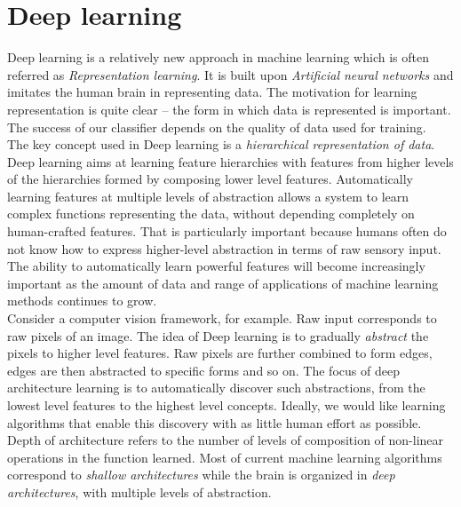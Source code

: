 
\section{Deep learning}

Deep learning is a relatively new approach in machine learning which is often referred  as \textit{Representation learning}. It is built upon \textit{Artificial neural networks} and imitates the human brain in representing  data. The motivation for learning representation is quite clear -- the form in which data is represented is important. The success of our classifier depends on the quality of data used for training. \\

The key concept used in Deep learning is a \textit{hierarchical representation of data}. Deep learning aims at learning feature hierarchies with features from higher levels of the hierarchies formed by composing lower level features. Automatically learning features at multiple levels of abstraction allows a system to learn complex functions representing the data, without depending completely on human-crafted features. That is particularly important because humans often do not know how to express higher-level abstraction in terms of raw sensory input. The ability to automatically learn powerful features will become increasingly important as the amount of data and range of applications of machine learning methods continues to grow. \\

Consider a computer vision framework, for example. Raw input corresponds to raw pixels of an image. The idea of Deep learning is to gradually \textit{abstract} the pixels to higher level features. Raw pixels are further combined to form edges, edges are then abstracted to specific forms and so on. The focus of deep architecture learning is to automatically discover such abstractions, from the lowest level features to the highest level concepts. Ideally, we would like learning algorithms that enable this discovery with as little human effort as possible. \\

Depth of architecture refers to the number of levels of composition of non-linear operations in the function learned. Most of current machine learning algorithms correspond to \textit{shallow architectures} while the brain is organized in \textit{deep architectures}, with multiple levels of abstraction. \\

